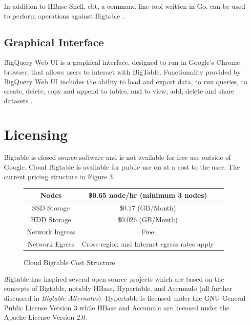 \documentclass[9pt,twocolumn,twoside]{styles/osajnl}
\begin{document}
In addition to HBase Shell, cbt, a command line tool written in Go, can be used to perform operations against Bigtable \cite{www-cbt}. 

\subsection{Graphical Interface}

BigQuery Web UI is a graphical interface, designed to run in Google's Chrome browser, that allows users to interact with BigTable. Functionality provided by BigQuery Web UI includes the ability to load and export data, to run queries, to create, delete, copy and append to tables, and to view, add, delete and share datasets \cite{www-bigquerywebui}.

\section{Licensing}

Bigtable is closed source software and is not available for free use outside of Google. Cloud Bigtable is available for public use on at a cost to the user. The current pricing structure in Figure 3.

\begin{figure}[ht]
\begin{center}
 \begin{tabular} {| c | c | c |}

 \hline
    
Nodes     &    \$0.65 node/hr (minimum 3 nodes) \\
 \hline
SSD Storage     &    \$0.17 (GB/Month)  \\
 \hline
HDD Storage & \$0.026 (GB/Month) \\
 \hline
Network Ingress & Free \\
 \hline
Network Egress & Cross-region and Internet egress rates apply \\
 \hline
\end{tabular}
\end{center}
  \caption{Cloud Bigtable Cost Structure \cite{www-cloudbigtable}} 
\end{figure}

Bigtable has inspired several open source projects which are based on the concepts of Bigtable, notably HBase, Hypertable, and Accumulo (all further discussed in \emph{Bigtable Alternates}). Hypertable is licensed under the GNU General Public License Version 3 while HBase and Accumulo are licensed under the Apache License Version 2.0.
\end{document}
